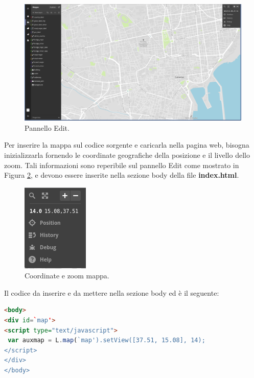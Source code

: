 \documentclass[a4paper,11pt]{article}
\begin{document}
\begin{figure}[ht]
	\centering
	\includegraphics[scale=0.26]{Edit.png}
	\caption{Pannello Edit.}
	\label{fig:6}
\end{figure}\newpage		
Per inserire la mappa sul codice sorgente e caricarla nella pagina web, bisogna inizializzarla fornendo le coordinate geografiche della posizione e il livello dello zoom. Tali informazioni sono reperibile sul pannello Edit come mostrato in  Figura \ref{fig:7}, e devono essere inserite nella sezione body della file \textbf{index.html}.
\begin{figure}[htbp]
	\centering
	\includegraphics[scale=1]{coordinate.png}
	\caption{Coordinate e zoom mappa.}
	\label{fig:7}
\end{figure}\newline

Il codice da inserire e da mettere nella sezione body ed è il seguente:

\begin{lstlisting}[language=HTML, basicstyle=\large]
<body>		
<div id=`map'>
<script type="text/javascript">
 var auxmap = L.map(`map').setView([37.51, 15.08], 14);
</script>
</div>
</body>
\end{lstlisting}
				
\end{document}
